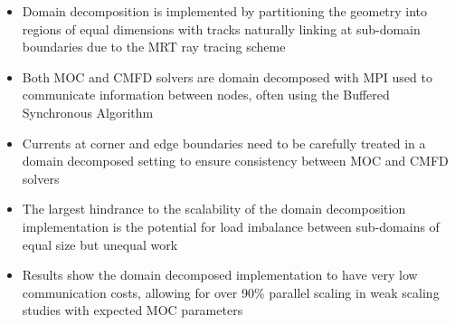 \newpage
\vfill
\begin{highlightsbox}[frametitle=Highlights]
	\begin{itemize}
		\item Domain decomposition is implemented by partitioning the geometry into regions of equal dimensions with tracks naturally linking at sub-domain boundaries due to the \ac{MRT} ray tracing scheme
		\item Both \ac{MOC} and \ac{CMFD} solvers are domain decomposed with \ac{MPI} used to communicate information between nodes, often using the Buffered Synchronous Algorithm
		\item Currents at corner and edge boundaries need to be carefully treated in a domain decomposed setting to ensure consistency between \ac{MOC} and \ac{CMFD} solvers
		\item The largest hindrance to the scalability of the domain decomposition implementation is the potential for load imbalance between sub-domains of equal size but unequal work
		\item Results show the domain decomposed implementation to have very low communication costs, allowing for over 90\% parallel scaling in weak scaling studies with expected \ac{MOC} parameters
		
	\end{itemize}
\end{highlightsbox}
\vfill